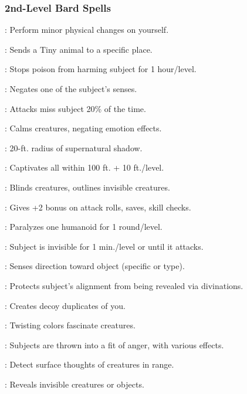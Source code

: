 \subsubsection{2nd-Level Bard Spells}
\begin{list}{}{\leftmargin=1em}
\item {}: Perform minor physical changes on yourself.
\item {}: Sends a Tiny animal to a specific place.
\item {}: Stops poison from harming subject for 1 hour/level.
\item {}: Negates one of the subject's senses.
\item {}: Attacks miss subject 20\% of the time.
\item {}: Calms creatures, negating emotion effects.
\item {}: 20-ft. radius of supernatural shadow.
\item {}: Captivates all within 100 ft. + 10 ft./level.
\item {}: Blinds creatures, outlines invisible creatures.
\item {}: Gives +2 bonus on attack rolls, saves, skill checks.
\item {}: Paralyzes one humanoid for 1 round/level.
\item {}: Subject is invisible for 1 min./level or until it attacks.
\item {}: Senses direction toward object (specific or type).
\item {}: Protects subject's alignment from being revealed via divinations.
\item {}: Creates decoy duplicates of you.
\item {}: Twisting colors fascinate creatures.
\item {}: Subjects are thrown into a fit of anger, with various effects.
\item {}: Detect surface thoughts of creatures in range.
\item {}: Reveals invisible creatures or objects.

\end{list}

